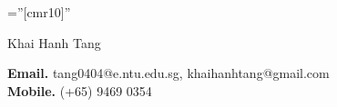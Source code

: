 \documentclass[a4paper, 11pt]{article}
\begin{document}
	
	
	\pagestyle{empty} %
	
	\font\fb=''[cmr10]'' %
	
	\par{\centering
		{\Huge Khai Hanh Tang
		}\bigskip\par}
	
	
	\textbf{Email.} tang0404@e.ntu.edu.sg, khaihanhtang@gmail.com\\
	\textbf{Mobile.} (+65) 9469 0354
	\begin{comment}
		\section{Personal Information}
		
		\begin{tabular}{rl}
			\textsc{Placeof Birth:} & Sadec City, Dong Thap Province, Vietnam \\
			\textsc{Date of Birth:} & September 16\textsuperscript{th} 1995 \\
			\textsc{Address:}   & University of Science, VNU-HCM\\
			& 227 Nguyen Van Cu, Ward 1, District 5, Ho Chi Minh city, Vietnam \\
			\textsc{Phone:}     & (+84) 905 718 507\\
			\textsc{email:}     &  \href{mailto:tang0404@e.ntu.edu.sg}{tang0404@e.ntu.edu.sg}
		\end{tabular}
	\end{comment}
\end{document}

